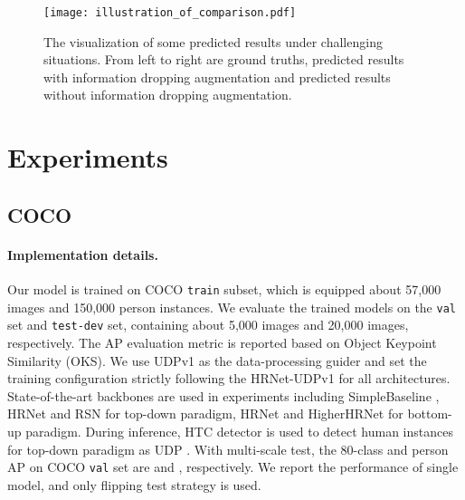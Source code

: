 \documentclass[final]{cvpr}
\begin{document}
\begin{figure*}[htb]
	\setlength{\abovecaptionskip}{0.cm}
    \begin{center}
        \texttt{[image: illustration\_of\_comparison.pdf]}
    \end{center}
   \caption{The visualization of some predicted results under challenging situations. From left to right are ground truths, predicted results with information dropping augmentation and predicted results without information dropping augmentation. }
    \label{fig:illustration}

\end{figure*}






\section{Experiments}
\label{sec:EP}
\subsection{COCO}
\label{sec:coco}
\paragraph{Implementation details.}
Our model is trained on COCO \texttt{train} subset, which is equipped about 57,000 images and 150,000 person instances. We evaluate the trained models on the \texttt{val} set and \texttt{test-dev} set, containing about 5,000 images and 20,000 images, respectively. The AP evaluation metric is reported based on Object Keypoint Similarity (OKS). We use UDPv1 \cite{UDP} as the data-processing guider and set the training configuration strictly following the HRNet-UDPv1 \cite{UDP} for all architectures. State-of-the-art backbones are used in experiments including SimpleBaseline \cite{SBNet}, HRNet \cite{HRNet} and RSN \cite{RSN} for top-down paradigm, HRNet \cite{HRNet} and HigherHRNet \cite{Higher} for bottom-up paradigm. During inference, HTC \cite{HTC} detector is used to detect human instances for top-down paradigm as UDP \cite{UDP}. With multi-scale test, the 80-class and person AP on COCO \texttt{val} set \cite{COCO} are  and , respectively. We report the performance of single model, and only flipping test strategy is used.
\end{document}
